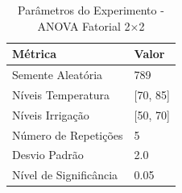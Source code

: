 \begin{table}[H]
\centering
\caption{Parâmetros do Experimento - ANOVA Fatorial 2×2}
\label{tab:parametros_fatorial}
\begin{tabular}{lp{8cm}}
\toprule
Métrica & Valor \\
\midrule
Semente Aleatória & 789 \\
Níveis Temperatura & [70, 85] \\
Níveis Irrigação & [50, 70] \\
Número de Repetições & 5 \\
Desvio Padrão & 2.0 \\
Nível de Significância & 0.05 \\
\bottomrule
\end{tabular}
\end{table}
